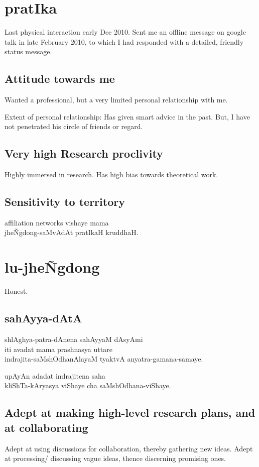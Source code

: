 \documentclass[oneside, article]{memoir}
\begin{document}
\chapter{pratIka}
Last physical interaction early Dec 2010. Sent me an offline message on google talk in late February 2010, to which I had responded with a detailed, friendly status message.

\section{Attitude towards me}
Wanted a professional, but a very limited personal relationship with me.

Extent of personal relationship: Has given smart advice in the past. But, I have not penetrated his circle of friends or regard.

\section{Very high Research proclivity}
Highly immersed in research. Has high bias towards theoretical work.

\section{Sensitivity to territory}
affiliation networks vishaye mama \\
jhe\~Ngdong-saMvAdAt pratIkaH kruddhaH.

\chapter{lu-jhe\~Ngdong}
Honest.

\section{sahAyya-dAtA}
shlAghya-patra-dAnena sahAyyaM dAsyAmi \\iti avadat mama prashnasya uttare \\indrajita-saMshOdhanAlayaM tyaktvA anyatra-gamana-samaye.

upAyAn adadat indrajitena saha \\kliShTa-kAryasya viShaye cha saMshOdhana-viShaye.

\section{Adept at making high-level research plans, and at collaborating}
Adept at using discussions for collaboration, thereby gathering new ideas. Adept at processing/ discussing vague ideas, thence discerning promising ones.
\end{document}
